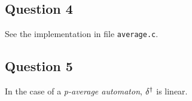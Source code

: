 
\subsection*{Question 4}
 
 See the implementation in file \texttt{average.c}.
  

\subsection*{Question 5}
 
\begin{prop}
 In the case of a \textit{p-average automaton}, $\delta^{\dag}$ is linear.
\end{prop}

